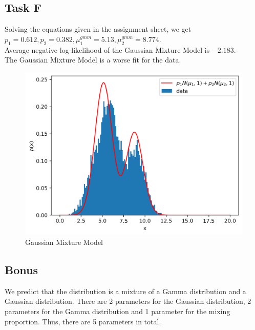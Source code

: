 \subsection*{Task F}
Solving the equations given in the assignment sheet, we get $p_1 = 0.612, p_2 = 0.382, \mu_1^{gmm} = 5.13, \mu_2^{gmm} = 8.774$.\\
Average negative log-likelihood of the Gaussian Mixture Model is $-2.183$.\\
The Gaussian Mixture Model is a worse fit for the data.
\begin{figure}
	\centering
	\includegraphics[width=0.5\linewidth]{images/3f.png}
	\caption{Gaussian Mixture Model}
\end{figure}
\subsection*{Bonus}
We predict that the distribution is a mixture of a Gamma distribution and a Gaussian distribution. There are 2 parameters for the Gaussian distribution, 2 parameters for the Gamma distribution and 1 parameter for the mixing proportion. Thus, there are 5 parameters in total.
